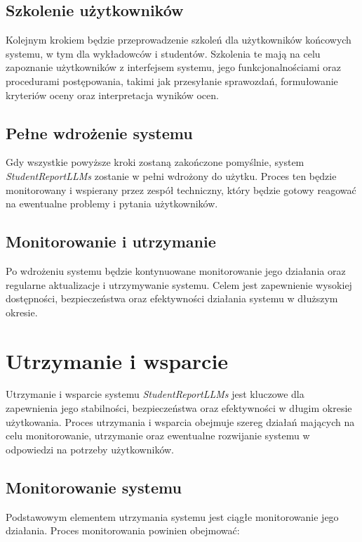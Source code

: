 \documentclass[a4paper, 12pt]{article}
\begin{document}
\subsection{Szkolenie użytkowników}

Kolejnym krokiem będzie przeprowadzenie szkoleń dla użytkowników końcowych systemu, w tym dla wykładowców i studentów. Szkolenia te mają na celu zapoznanie użytkowników z interfejsem systemu, jego funkcjonalnościami oraz procedurami postępowania, takimi jak przesyłanie sprawozdań, formułowanie kryteriów oceny oraz interpretacja wyników ocen.

\subsection{Pełne wdrożenie systemu}

Gdy wszystkie powyższe kroki zostaną zakończone pomyślnie, system \textit{StudentReportLLMs} zostanie w pełni wdrożony do użytku. Proces ten będzie monitorowany i wspierany przez zespół techniczny, który będzie gotowy reagować na ewentualne problemy i pytania użytkowników.

\subsection{Monitorowanie i utrzymanie}

Po wdrożeniu systemu będzie kontynuowane monitorowanie jego działania oraz regularne aktualizacje i utrzymywanie systemu. Celem jest zapewnienie wysokiej dostępności, bezpieczeństwa oraz efektywności działania systemu w dłuższym okresie.

\newpage
\section{Utrzymanie i wsparcie}
Utrzymanie i wsparcie systemu \textit{StudentReportLLMs} jest kluczowe dla zapewnienia jego stabilności, bezpieczeństwa oraz efektywności w długim okresie użytkowania. Proces utrzymania i wsparcia obejmuje szereg działań mających na celu monitorowanie, utrzymanie oraz ewentualne rozwijanie systemu w odpowiedzi na potrzeby użytkowników.

\subsection{Monitorowanie systemu}

Podstawowym elementem utrzymania systemu jest ciągłe monitorowanie jego działania. Proces monitorowania powinien obejmować:
\end{document}
